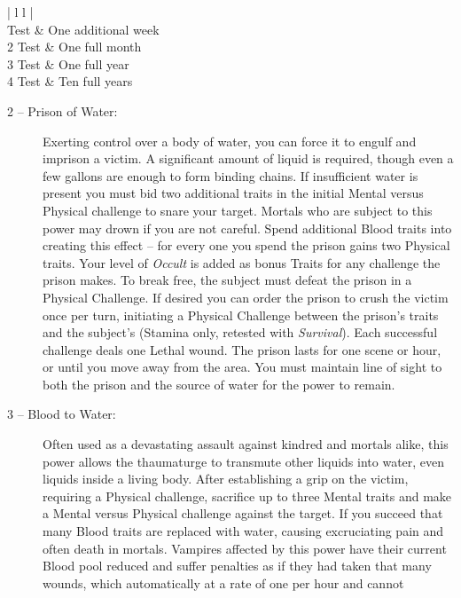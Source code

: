 \begin{center}
\begin{tabular}{ | l l |}
	\hline
	 \\
	 Test & One additional week \\
	2 Test & One full month \\
	3 Test & One full year \\
	4 Test & Ten full years \\
	\hline
\end{tabular}
\end{center}

\begin{description}
	\item[2 -- Prison of Water:]  Exerting control over a body of water, you can force it to engulf and imprison 
	a victim.  A significant amount of liquid is required, though even a few gallons are enough to form binding 
	chains.  If insufficient water is present you must bid two additional traits in the initial Mental versus 
	Physical challenge to snare your target.  Mortals who are subject to this power may drown if you are not careful.  
	Spend additional Blood traits into creating this effect -- for every one you spend the prison gains two Physical traits.  
	Your level of \emph{Occult} is added as bonus Traits for any challenge the prison makes.  To break free, the 
	subject must defeat the prison in a Physical Challenge.  If desired you can order the prison to crush the 
	victim once per turn, initiating a Physical Challenge between the prison's traits and the subject's (Stamina 
	only, retested with \emph{Survival}).  Each successful challenge deals one Lethal wound.  The prison lasts 
	for one scene or hour, or until you move away from the area.  You must maintain line of sight to both the 
	prison and the source of water for the power to remain.
	\item[3 -- Blood to Water:]  Often used as a devastating assault against kindred and mortals alike, this power 
	allows the thaumaturge to transmute other liquids into water, even liquids inside a living body.  After establishing 
	a grip on the victim, requiring a Physical challenge, sacrifice up to three Mental traits and make a Mental versus 
	Physical challenge against the target.  If you succeed that many Blood traits are replaced with water, causing 
	excruciating pain and often death in mortals.  Vampires affected by this power have their current Blood pool reduced 
	and suffer penalties as if they had taken that many wounds, which automatically at a rate of one per hour and cannot 

\end{description}
